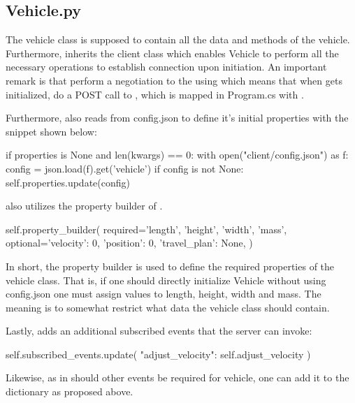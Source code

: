 \subsection{Vehicle.py}
The vehicle class is supposed to contain all the data and methods of the vehicle. Furthermore,  inherits the client class which enables Vehicle to perform all the necessary operations to establish connection upon initiation. An important remark is that  perform a negotiation to the using  which means that when  gets initialized,  do a POST call to , which is mapped in Program.cs with .

Furthermore,  also reads from config.json to define it's initial properties with the snippet shown below:
\begin{python}
if properties is None and len(kwargs) == 0:
	with open("client/config.json") as f:
		config = json.load(f).get('vehicle')
		if config is not None:
			self.properties.update(config)
\end{python}

 also utilizes the property builder of .

\begin{python}
self.property_builder(
	required={'length', 'height', 'width', 'mass'},
	optional={'velocity': 0, 'position': 0, 'travel_plan': None},
)
\end{python}

In short, the property builder is used to define the required properties of the vehicle class. That is, if one should directly initialize Vehicle without using config.json one must assign values to length, height, width and mass. The meaning is to somewhat restrict what data the vehicle class should contain.

Lastly,  adds an additional subscribed events that the server can invoke:
\begin{python}
self.subscribed_events.update({
	"adjust_velocity": self.adjust_velocity
})
\end{python}

Likewise, as in  should other events be required for vehicle, one can add it to the dictionary as proposed above.

